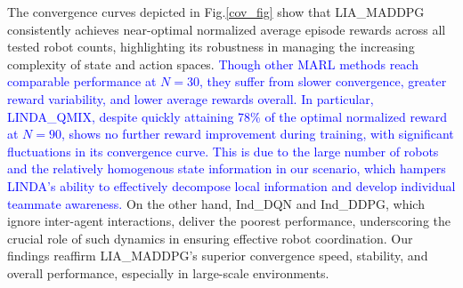 \documentclass[lettersize,journal]{IEEEtran}
\newcommand{\blue}[1]{\textcolor{blue}{#1}}
\begin{document}
The convergence curves depicted in Fig.\ref{cov_fig} show that LIA\_MADDPG consistently achieves near-optimal normalized average episode rewards across all tested robot counts, highlighting its robustness in managing the increasing complexity of state and action spaces. \blue{Though other MARL methods reach comparable performance at $N = 30$, they suffer from slower convergence, greater reward variability, and lower average rewards overall. In particular, LINDA\_QMIX, despite quickly attaining 78\% of the optimal normalized reward at $N = 90$, shows no further reward improvement during training, with significant fluctuations in its convergence curve. This is due to the large number of robots and the relatively homogenous state information in our scenario, which hampers LINDA’s ability to effectively decompose local information and develop individual teammate awareness.} On the other hand, Ind\_DQN and Ind\_DDPG, which ignore inter-agent interactions, deliver the poorest performance, underscoring the crucial role of such dynamics in ensuring effective robot coordination. Our findings reaffirm LIA\_MADDPG’s superior convergence speed, stability, and overall performance, especially in large-scale environments.
\end{document}
